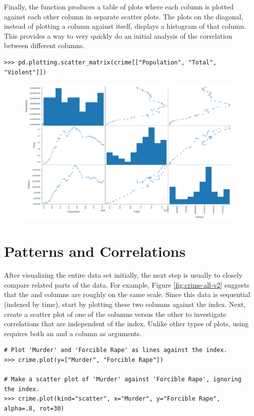 Finally, the function  produces a table of plots where each column is plotted against each other column in separate scatter plots.
The plots on the diagonal, instead of plotting a column against itself, displays a histogram of that column.
This provides a way to very quickly do an initial analysis of the correlation between different columns.

\begin{lstlisting}
>>> pd.plotting.scatter_matrix(crime[["Population", "Total", "Violent"]])
\end{lstlisting}

\begin{figure}[H]
    \includegraphics[width=.7\textwidth]{figures/scatter_table.pdf}
\end{figure}

\section*{Patterns and Correlations} %

After visualizing the entire data set initially, the next step is usually to closely compare related parts of the data.
For example, Figure \ref{fig:crime-all-v2} suggests that the  and  columns are roughly on the same scale.
Since this data is sequential (indexed by time), start by plotting these two columns against the index.
Next, create a scatter plot of one of the columns versus the other to investigate correlations that are independent of the index.
Unlike other types of plots, using  requires both an  and a  column as arguments.

\begin{lstlisting}
# Plot 'Murder' and 'Forcible Rape' as lines against the index.
>>> crime.plot(y=["Murder", "Forcible Rape"])

# Make a scatter plot of 'Murder' against 'Forcible Rape', ignoring the index.
>>> crime.plot(kind="scatter", x="Murder", y="Forcible Rape", alpha=.8, rot=30)
\end{lstlisting}

